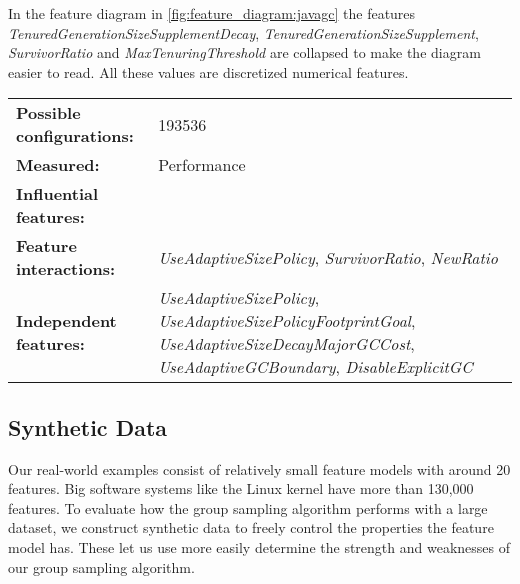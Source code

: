 \documentclass[../../thesis.tex]{subfiles}
\begin{document}
In the feature diagram in \autoref{fig:feature_diagram:javagc} the features
\textit{TenuredGenerationSizeSupplementDecay}, \textit{TenuredGenerationSizeSupplement}, \textit{SurvivorRatio} and
\textit{MaxTenuringThreshold} are collapsed to make the diagram easier to read. All these values are discretized
numerical features.
\\
\begingroup
\renewcommand{\arraystretch}{1.5}
\begin{tabular}{lp{}}
    \textbf{Possible configurations:} & 193536                                                                                                                                                                            \\
    \textbf{Measured:}                & Performance                                                                                                                                                                       \\
    \textbf{Influential features:}    &                                                                                                                                                                                   \\
    \textbf{Feature interactions:}    & \textit{UseAdaptiveSizePolicy}, \textit{SurvivorRatio}, \textit{NewRatio}                                                                                                         \\
    \textbf{Independent features:}    & \textit{UseAdaptiveSizePolicy}, \textit{UseAdaptiveSizePolicyFootprintGoal}, \textit{UseAdaptiveSizeDecayMajorGCCost}, \textit{UseAdaptiveGCBoundary}, \textit{DisableExplicitGC} \\
\end{tabular}
\endgroup

\newpage

\subsection{Synthetic Data}

Our real-world examples consist of relatively small feature models with around 20 features.
Big software systems like the Linux kernel have more than 130,000 \cite{kaltenecker2020interplay} features.
To evaluate how the group sampling algorithm performs with a large dataset, we construct synthetic data
to freely control the properties the feature model has. These let us use more easily determine the
strength and weaknesses of our group sampling algorithm.
\end{document}

